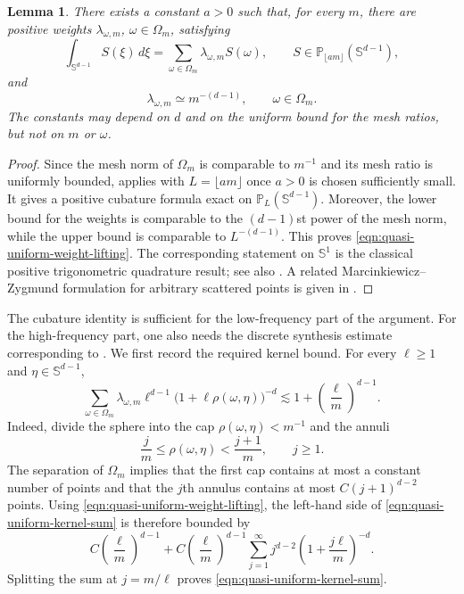\documentclass[10pt,a4paper]{amsart}
\numberwithin{equation}{section}
\newtheorem{lemma}{Lemma}
\def\SS{\mathbb{S}}
\begin{document}
\begin{lemma}\label{lem:quasi-uniform-cubature-lifting}
There exists a constant $a>0$ such that, for every $m$, there are positive weights $\lambda_{\omega,m}$, $\omega\in\Omega_m$, satisfying
\begin{equation}\label{eqn:quasi-uniform-cubature-lifting}
\int_{\SS^{d-1}}S(\xi)\,d\xi
=
\sum_{\omega\in\Omega_m}\lambda_{\omega,m}S(\omega),
\qquad
S\in\mathbb P_{\lfloor am\rfloor}(\SS^{d-1}),
\end{equation}
and
\begin{equation}\label{eqn:quasi-uniform-weight-lifting}
\lambda_{\omega,m}\simeq m^{-(d-1)},
\qquad
\omega\in\Omega_m.
\end{equation}
The constants may depend on $d$ and on the uniform bound for the mesh ratios, but not on $m$ or $\omega$.
\end{lemma}

\begin{proof}
Since the mesh norm of $\Omega_m$ is comparable to $m^{-1}$ and its mesh ratio is uniformly bounded, \cite[Corollary~4.4]{narcowich2006localized} applies with $L=\lfloor am\rfloor$ once $a>0$ is chosen sufficiently small. It gives a positive cubature formula exact on $\mathbb P_L(\SS^{d-1})$. Moreover, the lower bound for the weights is comparable to the $(d-1)$st power of the mesh norm, while the upper bound is comparable to $L^{-(d-1)}$. This proves \eqref{eqn:quasi-uniform-weight-lifting}. The corresponding statement on $\SS^1$ is the classical positive trigonometric quadrature result; see also \cite{mhaskar2001spherical}. A related Marcinkiewicz--Zygmund formulation for arbitrary scattered points is given in \cite[Theorem~2.1]{leGiaMhaskar2009localized}.
\end{proof}

The cubature identity is sufficient for the low-frequency part of the argument. For the high-frequency part, one also needs the discrete synthesis estimate corresponding to \cite[Lemmas~4.2--4.4]{petrushev1998approximation}. We first record the required kernel bound. For every $\ell\geq1$ and $\eta\in\SS^{d-1}$,
\begin{equation}\label{eqn:quasi-uniform-kernel-sum}
\sum_{\omega\in\Omega_m}
\lambda_{\omega,m}\ell^{d-1}
\bigl(1+\ell\rho(\omega,\eta)\bigr)^{-d}
\lesssim
1+\left(\frac{\ell}{m}\right)^{d-1}.
\end{equation}
Indeed, divide the sphere into the cap $\rho(\omega,\eta)<m^{-1}$ and the annuli
$$
\frac{j}{m}\leq\rho(\omega,\eta)<\frac{j+1}{m},
\qquad j\geq1.
$$
The separation of $\Omega_m$ implies that the first cap contains at most a constant number of points and that the $j$th annulus contains at most $C(j+1)^{d-2}$ points. Using \eqref{eqn:quasi-uniform-weight-lifting}, the left-hand side of \eqref{eqn:quasi-uniform-kernel-sum} is therefore bounded by
$$
C\left(\frac{\ell}{m}\right)^{d-1}
+
C\left(\frac{\ell}{m}\right)^{d-1}
\sum_{j=1}^{\infty}
j^{d-2}
\left(1+\frac{j\ell}{m}\right)^{-d}.
$$
Splitting the sum at $j=m/\ell$ proves \eqref{eqn:quasi-uniform-kernel-sum}.
\end{document}
